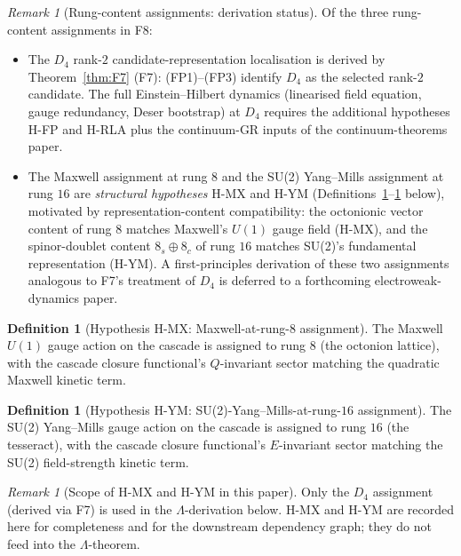 \documentclass[12pt]{article}
\theoremstyle{definition}
\newtheorem{definition}[theorem]{Definition}
\theoremstyle{remark}
\newtheorem{remark}[theorem]{Remark}
\begin{document}
\begin{remark}[Rung-content assignments: derivation status]\label{rem:rung-assignments}
Of the three rung-content assignments in F8:
\begin{itemize}
\item The $D_4$ rank-$2$ candidate-representation localisation is derived by Theorem~\ref{thm:F7} (F7): (FP1)--(FP3) identify $D_4$ as the selected rank-$2$ candidate. The full Einstein--Hilbert dynamics (linearised field equation, gauge redundancy, Deser bootstrap) at $D_4$ requires the additional hypotheses H-FP and H-RLA plus the continuum-GR inputs of the continuum-theorems paper.
\item The Maxwell assignment at rung $8$ and the SU(2) Yang--Mills assignment at rung $16$ are \emph{structural hypotheses} H-MX and H-YM (Definitions~\ref{hyp:MX}--\ref{hyp:YM} below), motivated by representation-content compatibility: the octonionic vector content of rung $8$ matches Maxwell's $U(1)$ gauge field (H-MX), and the spinor-doublet content $8_s \oplus 8_c$ of rung $16$ matches SU(2)'s fundamental representation (H-YM). A first-principles derivation of these two assignments analogous to F7's treatment of $D_4$ is deferred to a forthcoming electroweak-dynamics paper.
\end{itemize}
\end{remark}

\begin{definition}[Hypothesis H-MX: Maxwell-at-rung-$8$ assignment]\label{hyp:MX}
The Maxwell $U(1)$ gauge action on the cascade is assigned to rung $8$ (the octonion lattice), with the cascade closure functional's $Q$-invariant sector matching the quadratic Maxwell kinetic term.
\end{definition}

\begin{definition}[Hypothesis H-YM: SU(2)-Yang--Mills-at-rung-$16$ assignment]\label{hyp:YM}
The SU(2) Yang--Mills gauge action on the cascade is assigned to rung $16$ (the tesseract), with the cascade closure functional's $E$-invariant sector matching the SU(2) field-strength kinetic term.
\end{definition}

\begin{remark}[Scope of H-MX and H-YM in this paper]\label{rem:rung-scope}
Only the $D_4$ assignment (derived via F7) is used in the $\Lambda$-derivation below. H-MX and H-YM are recorded here for completeness and for the downstream dependency graph; they do not feed into the $\Lambda$-theorem.
\end{remark}
\end{document}
